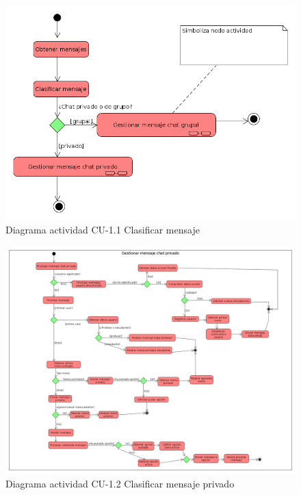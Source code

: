     \begin{figure}[H] %
\centering
\includegraphics[scale=0.5]{imagenes/diagramas/actividad/clasificar_mensaje.png}  %

\caption{Diagrama actividad CU-1.1 Clasificar mensaje}\label{figura111}
\end{figure}

    \begin{figure}[H] %
\centering
\includegraphics[scale=0.2]{imagenes/diagramas/actividad/mensaje_chat_privadoo.png}  %

\caption{Diagrama actividad CU-1.2 Clasificar mensaje privado}\label{figura131}
\end{figure}
    

